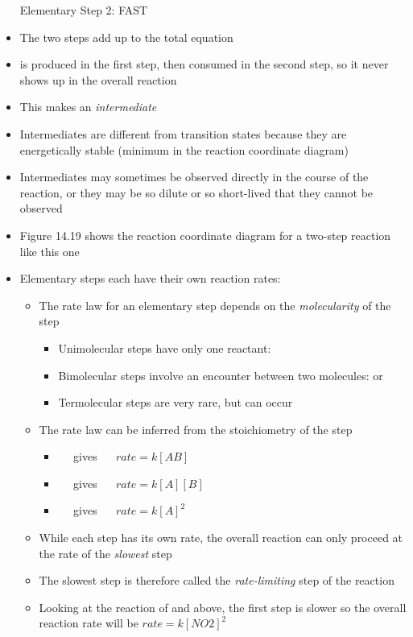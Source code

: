 \documentclass[12pt, openany, letterpaper]{memoir}
\begin{document}
\begin{itemize}
	Elementary Step 2:  \hspace{1em} FAST
	\item The two steps add up to the total equation
	\item {} is produced in the first step, then consumed in the second step, so it never shows up in the overall reaction
	\item This makes  an \emph{intermediate}
	\item Intermediates are different from transition states because they are energetically stable (minimum in the reaction coordinate diagram)
	\item Intermediates may sometimes be observed directly in the course of the reaction, or they may be so dilute or so short-lived that they cannot be observed
	\item Figure 14.19 shows the reaction coordinate diagram for a two-step reaction like this one
	\item Elementary steps each have their own reaction rates:
	\begin{itemize}
		\item The rate law for an elementary step depends on the \emph{molecularity} of the step
		\begin{itemize}
			\item Unimolecular steps have only one reactant: 
			\item Bimolecular steps involve an encounter between two molecules:  or 
			\item Termolecular steps are very rare, but can occur
		\end{itemize}
		\item The rate law can be inferred from the stoichiometry of the step
		\begin{itemize}
			\item {} ~~ gives ~~ $rate=k\left[AB\right]$
			\item {} ~~ gives ~~ $rate=k\left[A\right]\left[B\right]$
			\item {} ~~ gives ~~ $rate=k\left[A\right]^2$
		\end{itemize}
		\item While each step has its own rate, the overall reaction can only proceed at the rate of the \emph{slowest} step
		\item The slowest step is therefore called the \emph{rate-limiting} step of the reaction
		\item Looking at the reaction of  and  above, the first step is slower so the overall reaction rate will be $rate=k\left[NO2\right]^2$

\end{itemize}
\end{itemize}
\end{document}
